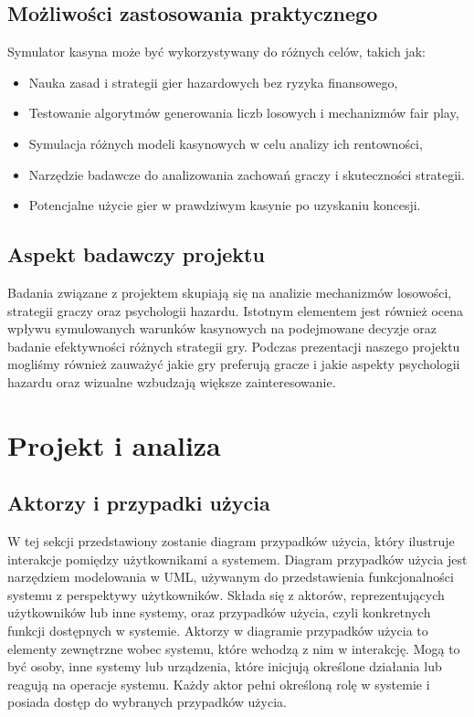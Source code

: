 \documentclass[a4paper,12pt]{article}
\begin{document}
\subsection{Możliwości zastosowania praktycznego}

Symulator kasyna może być wykorzystywany do różnych celów, takich jak:
\begin{itemize}
    \item Nauka zasad i strategii gier hazardowych bez ryzyka finansowego,
    \item Testowanie algorytmów generowania liczb losowych i mechanizmów fair play,
    \item Symulacja różnych modeli kasynowych w celu analizy ich rentowności,
    \item Narzędzie badawcze do analizowania zachowań graczy i skuteczności strategii.
    \item Potencjalne użycie gier w prawdziwym kasynie po uzyskaniu koncesji.
\end{itemize}

\subsection{Aspekt badawczy projektu}

Badania związane z projektem skupiają się na analizie mechanizmów losowości, strategii graczy oraz psychologii hazardu. Istotnym elementem jest również ocena wpływu symulowanych warunków kasynowych na podejmowane decyzje oraz badanie efektywności różnych strategii gry. Podczas prezentacji naszego projektu mogliśmy również zauważyć jakie gry preferują gracze i jakie aspekty psychologii hazardu oraz wizualne wzbudzają większe zainteresowanie.


\newpage
\section{Projekt i analiza}
\subsection{Aktorzy i przypadki użycia}

W tej sekcji przedstawiony zostanie diagram przypadków użycia, który ilustruje interakcje pomiędzy użytkownikami a systemem. Diagram przypadków użycia jest narzędziem modelowania w UML, używanym do przedstawienia funkcjonalności systemu z perspektywy użytkowników. Składa się z aktorów, reprezentujących użytkowników lub inne systemy, oraz przypadków użycia, czyli konkretnych funkcji dostępnych w systemie. Aktorzy w diagramie przypadków użycia to elementy zewnętrzne wobec systemu, które wchodzą z nim w interakcję. Mogą to być osoby, inne systemy lub urządzenia, które inicjują określone działania lub reagują na operacje systemu. Każdy aktor pełni określoną rolę w systemie i posiada dostęp do wybranych przypadków użycia.
\end{document}
